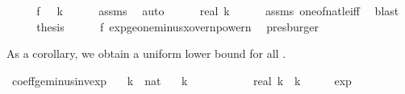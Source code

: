 \begin{isabellebody}
%
\isadelimproof
%
\endisadelimproof
%
\isatagproof
{}\isamarkupfalse%
\ {\isacharminus}{\kern0pt}\isanewline
\ \ \isamarkupfalse%
\ f{}{\isacharcolon}{\kern0pt}\ {\isachardoublequoteopen}{}\ {\isacharless}{\kern0pt}\ k{\isachardoublequoteclose}\isanewline
\ \ \ \ \isamarkupfalse%
\ assms\ \isamarkupfalse%
\ auto\isanewline
\ \ \isamarkupfalse%
\ {\isachardoublequoteopen}{}\ {\isasymle}\ real\ k{\isachardoublequoteclose}\isanewline
\ \ \ \ \isamarkupfalse%
\ assms\ one{\isacharunderscore}{\kern0pt}of{\isacharunderscore}{\kern0pt}nat{\isacharunderscore}{\kern0pt}le{\isacharunderscore}{\kern0pt}iff\ \isamarkupfalse%
\ blast\isanewline
\ \ \isamarkupfalse%
\ \isamarkupfalse%
\ {\isacharquery}{\kern0pt}thesis\isanewline
\ \ \ \ \isamarkupfalse%
\ f{}\ exp{\isacharunderscore}{\kern0pt}ge{\isacharunderscore}{\kern0pt}one{\isacharunderscore}{\kern0pt}minus{\isacharunderscore}{\kern0pt}x{\isacharunderscore}{\kern0pt}over{\isacharunderscore}{\kern0pt}n{\isacharunderscore}{\kern0pt}power{\isacharunderscore}{\kern0pt}n\ \isamarkupfalse%
\ presburger\isanewline
{}\isamarkupfalse%
%
\endisatagproof
{\isafoldproof}%
%
\isadelimproof
%
\endisadelimproof
%
\begin{isamarkuptext}%
As a corollary, we obtain a uniform lower bound
   for all .%
\end{isamarkuptext}\isamarkuptrue%
\isamarkupfalse%
\ coeff{\isacharunderscore}{\kern0pt}ge{\isacharunderscore}{\kern0pt}{}{\isacharunderscore}{\kern0pt}minus{\isacharunderscore}{\kern0pt}inv{\isacharunderscore}{\kern0pt}exp{\isacharcolon}{\kern0pt}\isanewline
\ \ \ k\ {\isacharcolon}{\kern0pt}{\isacharcolon}{\kern0pt}\ nat\isanewline
\ \ \ {\isachardoublequoteopen}k\ {\isasymge}\ {}{\isachardoublequoteclose}\isanewline
\ \ \ {\isachardoublequoteopen}{}\ {\isacharminus}{\kern0pt}\ {\isacharparenleft}{\kern0pt}{}\ {\isacharminus}{\kern0pt}\ {}\ {\isacharslash}{\kern0pt}\ real\ k{\isacharparenright}{\kern0pt}\ {\isacharcircum}{\kern0pt}\ k\ {\isasymge}\ {}\ {\isacharminus}{\kern0pt}\ {}\ {\isacharslash}{\kern0pt}\ exp\ {}{\isachardoublequoteclose}\isanewline

\end{isabellebody}
